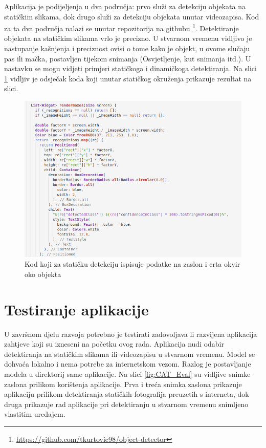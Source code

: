 Aplikacija je podijeljenja u dva područja: prvo služi za detekciju objekata na statičkim slikama, dok drugo služi za detekciju objekata unutar videozapisa. Kod za ta dva područja nalazi se unutar repozitorija na githubu \footnote{\url{https://github.com/tkurtovic98/object-detector}}.\newline
Detektiranje objekata na statičkim slikama vrlo je precizno. U stvarnom vremenu vidljivo je nastupanje kašnjenja i preciznost ovisi o tome 
kako je objekt, u ovome slučaju pas ili mačka, postavljen tijekom snimanja (Osvjetljenje, kut snimanja itd.). U nastavku se mogu vidjeti primjeri statičkoga i dinamičkoga detektiranja. Na slici \ref{Flutter-render-boxes} vidljiv je odsječak koda koji
unutar statičkog okruženja prikazuje rezultat na slici.

\begin{figure}[htb]
    \centering
    \includegraphics[width=14cm]{img/Flutter-render-boxes.png}
    \caption{Kod koji za statičku detekciju ispisuje podatke na zaslon i crta okvir oko objekta}
    \label{Flutter-render-boxes}
\end{figure}

\section{Testiranje aplikacije}
U završnom djelu razvoja potrebno je testirati zadovoljava li razvijena aplikacija zahtjeve koji su izneseni na početku ovog rada. Aplikacija nudi odabir 
detektiranja na statičkim slikama ili videozapisu u stvarnom vremenu. Model se dohvaća lokalno i nema potrebe za internetskom vezom. Razlog je postavljanje modela 
u direktorij same aplikacije.
Na slici \ref{fig:CAT_Eval} su vidljive snimke zaslona prilikom korištenja aplikacije. 
Prva i treća snimka zaslona prikazuje aplikaciju prilikom detektiranja statičkih fotografija preuzetih s interneta, dok druga prikazuje rad aplikacije pri detektiranju u stvarnom vremenu snimljeno vlastitim uređajem.


